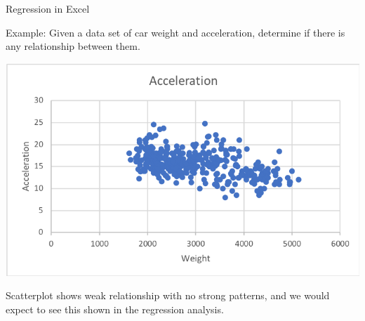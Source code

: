 \documentclass[xcolor=svgnames]{beamer}
\begin{document}
\begin{frame}[label=current]{Regression in Excel}
\begin{exampleblock}{
Example:} Given a data set of car weight and acceleration, determine if there is any relationship between them.\end{exampleblock}

\begin{center}
\includegraphics[height=.45\textheight]{avsw2}
\end{center}
Scatterplot shows weak relationship with no strong patterns, and we would expect to see this shown in the regression analysis.
\end{frame}
\end{document}

